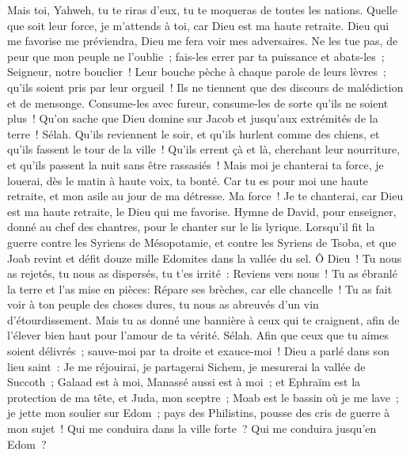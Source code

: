 \begin{multicols}{2}
Mais toi, Yahweh, tu te riras d'eux, tu te moqueras de toutes les nations.
Quelle que soit leur force, je m'attends à toi, car Dieu est ma haute retraite.
Dieu qui me favorise me préviendra, Dieu me fera voir mes adversaires.
Ne les tue pas, de peur que mon peuple ne l'oublie~; fais-les errer par ta puissance et abats-les~; Seigneur, notre bouclier~!
Leur bouche pèche à chaque parole de leurs lèvres~; qu'ils soient pris par leur orgueil~! Ils ne tiennent que des discours de malédiction et de mensonge.
Consume-les avec fureur, consume-les de sorte qu'ils ne soient plus~! Qu'on sache que Dieu domine sur Jacob et jusqu'aux extrémités de la terre~! Sélah.
Qu'ils reviennent le soir, et qu'ils hurlent comme des chiens, et qu'ils fassent le tour de la ville~!
Qu'ils errent çà et là, cherchant leur nourriture, et qu'ils passent la nuit sans être rassasiés~!
Mais moi je chanterai ta force, je louerai, dès le matin à haute voix, ta bonté. Car tu es pour moi une haute retraite, et mon asile au jour de ma détresse.
Ma force~! Je te chanterai, car Dieu est ma haute retraite, le Dieu qui me favorise.
\VerseOne{}Hymne de David, pour enseigner, donné au chef des chantres, pour le chanter sur le lis lyrique.
Lorsqu'il fit la guerre contre les Syriens de Mésopotamie, et contre les Syriens de Tsoba, et que Joab revint et défit douze mille Edomites dans la vallée du sel.
Ô Dieu~! Tu nous as rejetés, tu nous as dispersés, tu t'es irrité~: Reviens vers nous~!
Tu as ébranlé la terre et l'as mise en pièces: Répare ses brèches, car elle chancelle~!
Tu as fait voir à ton peuple des choses dures, tu nous as abreuvés d'un vin d'étourdissement.
Mais tu as donné une bannière à ceux qui te craignent, afin de l'élever bien haut pour l'amour de ta vérité. Sélah.
Afin que ceux que tu aimes soient délivrés~; sauve-moi par ta droite et exauce-moi~!
Dieu a parlé dans son lieu saint~: Je me réjouirai, je partagerai Sichem, je mesurerai la vallée de Succoth~;
Galaad est à moi, Manassé aussi est à moi~; et Ephraïm est la protection de ma tête, et Juda, mon sceptre~;
Moab est le bassin où je me lave~; je jette mon soulier sur Edom~; pays des Philistins, pousse des cris de guerre à mon sujet~!
Qui me conduira dans la ville forte~? Qui me conduira jusqu'en Edom~?

\end{multicols}
